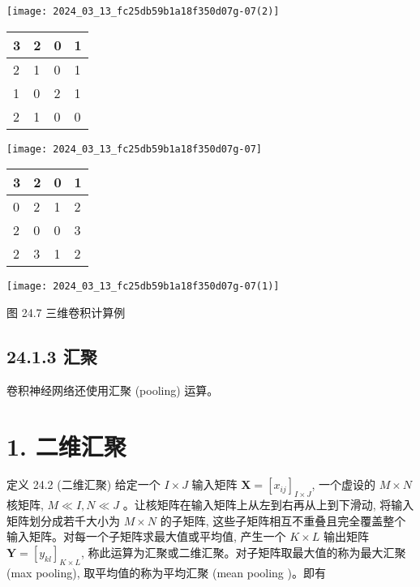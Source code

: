 \documentclass[10pt]{article}
\begin{document}
\begin{center}
\texttt{[image: 2024\_03\_13\_fc25db59b1a18f350d07g-07(2)]}
\end{center}

\begin{center}
\begin{tabular}{|l|l|l|l|}
\hline
3 & 2 & 0 & 1 \\
\hline
2 & 1 & 0 & 1 \\
\hline
1 & 0 & 2 & 1 \\
\hline
2 & 1 & 0 & 0 \\
\hline
\end{tabular}
\end{center}

\begin{center}
\texttt{[image: 2024\_03\_13\_fc25db59b1a18f350d07g-07]}
\end{center}

\begin{center}
\begin{tabular}{|l|l|l|l|}
\hline
3 & 2 & 0 & 1 \\
\hline
0 & 2 & 1 & 2 \\
\hline
2 & 0 & 0 & 3 \\
\hline
2 & 3 & 1 & 2 \\
\hline
\end{tabular}
\end{center}

\begin{center}
\texttt{[image: 2024\_03\_13\_fc25db59b1a18f350d07g-07(1)]}
\end{center}

图 24.7 三维卷积计算例

\subsection*{24.1.3 汇聚}
卷积神经网络还使用汇聚 (pooling) 运算。

\section*{1. 二维汇聚}
定义 24.2 (二维汇聚) 给定一个 $I \times J$ 输入矩阵 $\boldsymbol{X}=\left[x_{i j}\right]_{I \times J}$, 一个虚设的 $M \times N$ 核矩阵, $M \ll I, N \ll J$ 。让核矩阵在输入矩阵上从左到右再从上到下滑动, 将输入矩阵划分成若千大小为 $M \times N$ 的子矩阵, 这些子矩阵相互不重叠且完全覆盖整个输入矩阵。对每一个子矩阵求最大值或平均值, 产生一个 $K \times L$ 输出矩阵 $\boldsymbol{Y}=\left[y_{k l}\right]_{K \times L}$, 称此运算为汇聚或二维汇聚。对子矩阵取最大值的称为最大汇聚 (max pooling), 取平均值的称为平均汇聚 (mean pooling )。即有
\end{document}
